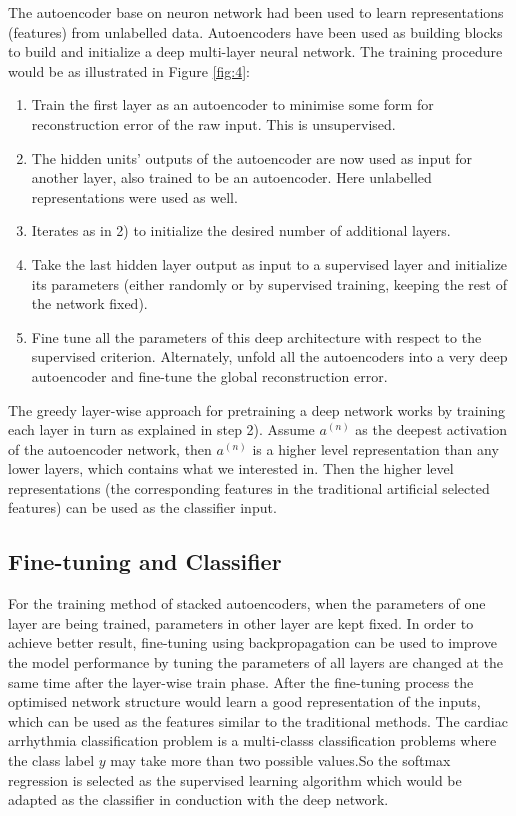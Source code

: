 \documentclass[graybox]{svmult}
\begin{document}
The autoencoder base on neuron network had been used to learn representations (features) from unlabelled data. Autoencoders have been used as building blocks to build and initialize a deep multi-layer neural network. The training procedure would be \cite{bengio2009learning} as illustrated in Figure \ref{fig:4}:
\begin{enumerate}
\item Train the first layer as an autoencoder to minimise some form for reconstruction error of the raw input. This is unsupervised.
\item The hidden units' outputs of the autoencoder are now used as input for another layer, also trained to be an autoencoder. Here unlabelled representations were used as well.
\item Iterates as in 2) to initialize the desired number of additional layers.
\item Take the last hidden layer output as input to a supervised layer and initialize its parameters (either randomly or by supervised training, keeping the rest of the network fixed).
\item Fine tune all the parameters of this deep architecture with respect to the supervised criterion. Alternately, unfold all the autoencoders into a very deep autoencoder and fine-tune the global reconstruction error.
\end{enumerate}
The greedy layer-wise approach for pretraining a deep network works by training each layer in turn as explained in step 2). Assume $a^{(n)}$ as the deepest activation of the autoencoder network, then $a^{(n)}$ is a higher level representation than any lower layers, which contains what we interested in. Then the higher level representations (the corresponding features in the traditional artificial selected features) can be used as the classifier input.


\subsection{Fine-tuning and Classifier}
For the training method of stacked autoencoders, when the parameters of one layer are being trained, parameters in other layer are kept fixed. In order to achieve better result, fine-tuning using backpropagation can be used to improve the model performance by tuning the parameters of all layers are changed at the same time after the layer-wise train phase. After the fine-tuning process the optimised network structure would learn a good representation of the inputs, which can be used as the features similar to the traditional methods. The cardiac arrhythmia classification problem is a multi-classs classification problems where the class label $y$ may take more than two possible values.So the softmax regression is selected as the supervised learning algorithm which would be adapted as the classifier in conduction with the deep network.
\end{document}
